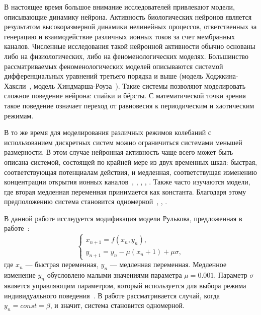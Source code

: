 \documentclass[a4paper, 14pt]{extreport}
\numberwithin{equation}{section}
\numberwithin{figure}{section}
\numberwithin{table}{section}
\begin{document}
В настоящее время большое внимание исследователей привлекают модели, описывающие динамику нейрона. Активность биологических нейронов является результатом высокоразмерной динамики нелинейных процессов, ответственных за генерацию и взаимодействие различных ионных токов за счет мембранных каналов. Численные исследования такой нейронной активности обычно основаны либо на физиологических, либо на феноменологических моделях. Большинство рассматриваемых феноменологических моделей описываются системой дифференциальных уравнений третьего порядка и выше (модель Ходжкина-Хаксли~\cite{Hodgkin1952}, модель Хиндмарша-Роуза~\cite{Hindmarsh1984}). Такие системы позволяют моделировать сложное поведение нейрона: спайки и бёрсты. С математической точки зрения такое поведение означает переход от равновесия к периодическим и хаотическим режимам.

В то же время для моделирования различных режимов колебаний с использованием дискретных систем можно ограничиться системами меньшей размерности. В этом случае нейронная активность чаще всего может быть описана системой, состоящей по крайней мере из двух временных шкал: быстрая, соответствующая потенциалам действия, и медленная, соответствущая изменению концентрации открытия ионных каналов~\cite{Bashkirtseva2018}, \cite{Bashkirtseva2018b}, \cite {Rulkov2002}, \cite{Rulkov2018}, \cite{ShilnikovRulkov2003}. Также часто изучаются модели, где вторая медленная переменная принимается как константа. Благодаря этому предположению система становится одномерной~\cite{Rulkov2018}, \cite{Bashkirtseva2015}, \cite{Mesbah2014}.

В данной работе исследуется модификация модели Рулькова, предложенная в работе~\cite{Rulkov2002}:
\begin{equation}
    \begin{cases}
		x_{n + 1} = f(x_{n}, y_{n}), \\
		y_{n + 1} = y_{n} - \mu (x_{n} + 1) + \mu \sigma,
    \end{cases}
\end{equation}
где $ x_{n} $ --- быстрая переменная, $ y_{n} $ --- медленная переменная. Медленное изменение $ y_{n} $ обусловлено малыми значениями параметра $ \mu = 0.001 $. Параметр $ \sigma $ является управляющим параметром, который используется для выбора режима индивидуального поведения~\cite{ShilnikovRulkov2003}. В работе рассматривается случай, когда $ y_{n} = const = \beta $, и значит, система становится одномерной.
\end{document}

